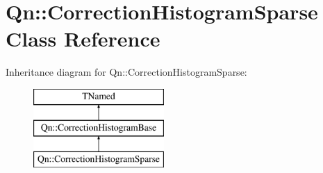 \hypertarget{classQn_1_1CorrectionHistogramSparse}{}\section{Qn\+:\+:Correction\+Histogram\+Sparse Class Reference}
\label{classQn_1_1CorrectionHistogramSparse}
Inheritance diagram for Qn\+:\+:Correction\+Histogram\+Sparse\+:\begin{figure}[H]
\begin{center}
\leavevmode
\includegraphics[height=3.000000cm]{classQn_1_1CorrectionHistogramSparse}
\end{center}
\end{figure}
